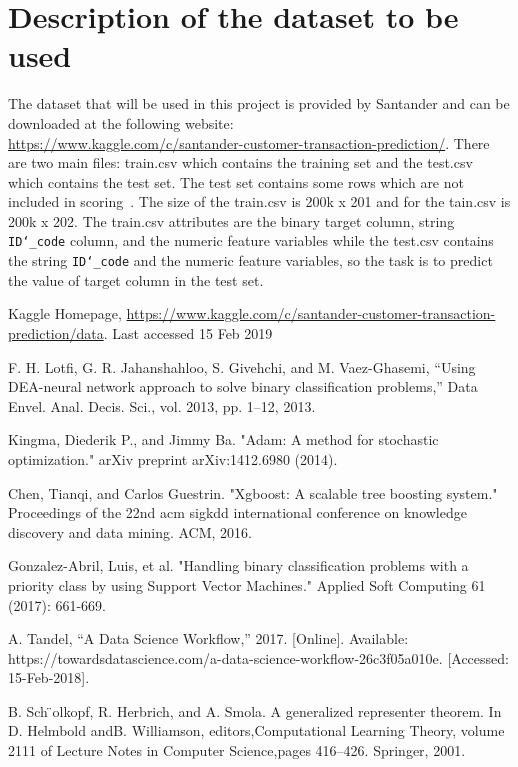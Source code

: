 \documentclass{llncs}
\begin{document}
\section{Description of the dataset to be used}
The dataset that will be used in this project is provided by Santander and can be downloaded at the following website: \\ \url{https://www.kaggle.com/c/santander-customer-transaction-prediction/}.
There are two main files: train.csv which contains the training set and the test.csv which contains the test set. The test set contains some rows which are not included in scoring~\cite{ref_url1}. The size of the train.csv is 200k x 201 and for the tain.csv is 200k x 202. The train.csv attributes are the binary target column, string \texttt{ID\char`_code} column, and the numeric feature variables while the test.csv contains the string \texttt{ID\char`_code} and the numeric feature variables, so the task is to predict the value of target column in the test set.




%
%

\begin{thebibliography}{8}

Kaggle Homepage, \url{https://www.kaggle.com/c/santander-customer-transaction-prediction/data}. Last accessed 15 Feb 2019

F. H. Lotfi, G. R. Jahanshahloo, S. Givehchi, and M. Vaez-Ghasemi, “Using DEA-neural network approach to solve binary classification problems,” Data Envel. Anal. Decis. Sci., vol. 2013, pp. 1–12, 2013.

Kingma, Diederik P., and Jimmy Ba. "Adam: A method for stochastic optimization." arXiv preprint arXiv:1412.6980 (2014).

Chen, Tianqi, and Carlos Guestrin. "Xgboost: A scalable tree boosting system." Proceedings of the 22nd acm sigkdd international conference on knowledge discovery and data mining. ACM, 2016.

Gonzalez-Abril, Luis, et al. "Handling binary classification problems with a priority class by using Support Vector Machines." Applied Soft Computing 61 (2017): 661-669.

A. Tandel, “A Data Science Workflow,” 2017. [Online]. Available: https://towardsdatascience.com/a-data-science-workflow-26c3f05a010e. [Accessed: 15-Feb-2018].

 B.  Sch ̈olkopf,  R.  Herbrich,  and  A.  Smola.  A  generalized  representer  theorem.  In  D.  Helmbold  andB. Williamson, editors,Computational Learning Theory, volume 2111 of Lecture Notes in Computer Science,pages 416–426. Springer, 2001.

\end{thebibliography}
\end{document}
